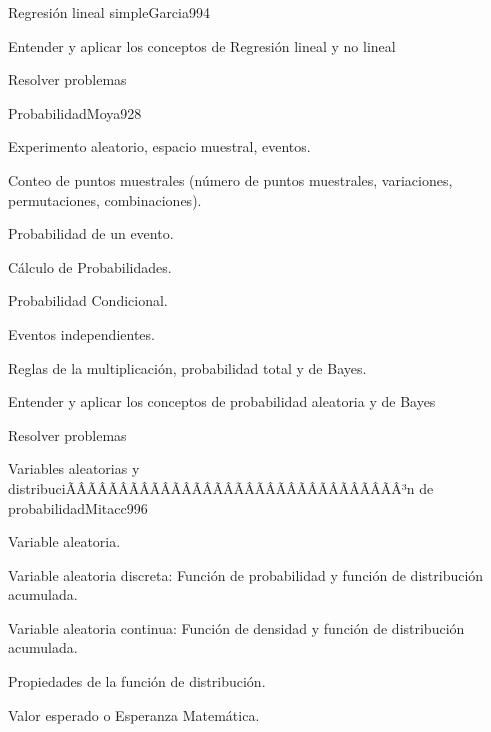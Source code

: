 \begin{sumilla}
\begin{unit}{Regresi\'on lineal simple}{Garcia99}{4}
   \begin{objetivos}
         \item  Entender y aplicar los conceptos de Regresi\'on lineal y no lineal
         \item  Resolver problemas
   \end{objetivos}
\end{unit}

\begin{unit}{Probabilidad}{Moya92}{8}
   \begin{topicos}
         \item  Experimento aleatorio, espacio muestral, eventos.
	 \item  Conteo de puntos muestrales (n\'umero de puntos muestrales, variaciones, permutaciones, combinaciones).
         \item  Probabilidad de un evento.
	 \item  C\'alculo de Probabilidades.
	\item Probabilidad Condicional.
	\item Eventos independientes.
	\item Reglas de la multiplicaci\'on, probabilidad total y de Bayes.
   \end{topicos}

   \begin{objetivos}
         \item  Entender y aplicar los conceptos de probabilidad aleatoria y de Bayes
         \item  Resolver problemas
   \end{objetivos}
\end{unit}

\begin{unit}{Variables aleatorias y distribuciÃÂÃÂÃÂÃÂÃÂÃÂÃÂÃÂÃÂÃÂÃÂÃÂÃÂÃÂÃÂÃÂ³n de probabilidad}{Mitacc99}{6}
   \begin{topicos}
         \item  Variable aleatoria.
	 \item  Variable aleatoria discreta: Funci\'on de probabilidad y funci\'on de distribuci\'on acumulada.
         \item  Variable aleatoria continua: Funci\'on de densidad y funci\'on de distribuci\'on acumulada.
	 \item  Propiedades de la funci\'on de distribuci\'on.
         \item  Valor esperado o Esperanza Matem\'atica.
   \end{topicos}


\end{unit}
\end{sumilla}
